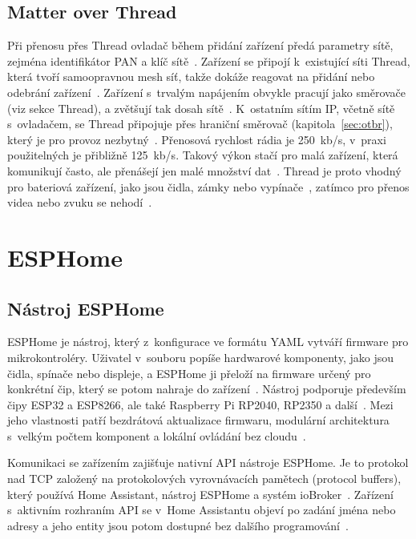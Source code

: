 \subsection{Matter over Thread}

Při přenosu přes Thread ovladač během přidání zařízení předá parametry sítě,
zejména identifikátor PAN a klíč sítě~\cite{silabs-matter-commissioning}.
Zařízení se připojí k~existující síti Thread, která tvoří samoopravnou mesh
síť, takže dokáže reagovat na přidání nebo odebrání zařízení~\cite{nordic-matter}.
Zařízení s~trvalým napájením obvykle pracují jako směrovače (viz sekce Thread),
a zvětšují tak dosah sítě~\cite{nordic-matter}. K~ostatním sítím IP, včetně
sítě s~ovladačem, se Thread připojuje přes hraniční směrovač
(kapitola~\ref{sec:otbr}), který je pro provoz nezbytný~\cite{quectel-matter-wifi-thread}.
Přenosová rychlost rádia je 250~kb/s, v~praxi použitelných je přibližně
125~kb/s. Takový výkon stačí pro malá zařízení, která komunikují často,
ale přenášejí jen malé množství dat~\cite{quectel-matter-wifi-thread}. Thread je
proto vhodný pro bateriová zařízení, jako jsou čidla, zámky nebo
vypínače~\cite{quectel-matter-wifi-thread}, zatímco pro přenos videa nebo zvuku
se nehodí~\cite{nordic-matter}.

\section{ESPHome}

\subsection{Nástroj ESPHome}

ESPHome je nástroj, který z~konfigurace ve formátu YAML vytváří firmware pro
mikrokontroléry. Uživatel v~souboru popíše hardwarové komponenty, jako jsou
čidla, spínače nebo displeje, a ESPHome ji přeloží na firmware určený pro
konkrétní čip, který se potom nahraje do zařízení~\cite{ha-esphome}. Nástroj
podporuje především čipy ESP32 a ESP8266, ale také Raspberry Pi RP2040,
RP2350 a další~\cite{esphome-homepage}. Mezi jeho vlastnosti patří bezdrátová
aktualizace firmwaru, modulární architektura s~velkým počtem komponent
a lokální ovládání bez cloudu~\cite{esphome-homepage}.

Komunikaci se zařízením zajišťuje nativní API nástroje ESPHome. Je to
protokol nad TCP založený na protokolových vyrovnávacích pamětech (protocol
buffers), který používá Home Assistant, nástroj ESPHome a systém
ioBroker~\cite{esphome-api}. Zařízení s~aktivním rozhraním API se v~Home
Assistantu objeví po zadání jména nebo adresy a jeho entity jsou potom
dostupné bez dalšího programování~\cite{ha-esphome,esphome-api}.

